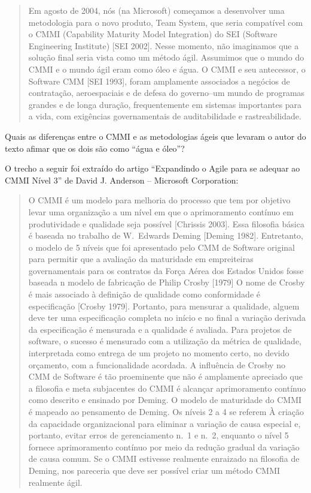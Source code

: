 \begin{quote}
  Em agosto de 2004, nós (na Microsoft) começamos a desenvolver uma
  metodologia para o novo produto, Team System, que seria compatível
  com o CMMI (Capability Maturity Model Integration) do SEI (Software
  Engineering Institute) [SEI 2002]. Nesse momento, não imaginamos que
  a solução final seria vista como um método ágil. Assumimos que o
  mundo do CMMI e o mundo ágil eram como óleo e água. O CMMI e seu
  antecessor, o Software CMM [SEI 1993], foram amplamente associados a
  negócios de contratação, aeroespaciais e de defesa do governo--um
  mundo de programas grandes e de longa duração, frequentemente em
  sistemas importantes para a vida, com exigências governamentais de
  auditabilidade e rastreabilidade.
\end{quote}

Quais as diferenças entre o CMMI e as metodologias ágeis que levaram o
autor do texto afimar que os dois são como ``água e óleo''?

 O trecho a seguir foi extraído do artigo 
``Expandindo o Agile para se adequar ao CMMI Nível 3'' de 
David J. Anderson -- Microsoft Corporation:

\begin{quote}
  O CMMI é um modelo para melhoria do processo que tem por objetivo
  levar uma organização a um nível em que o aprimoramento contínuo em
  produtividade e qualidade seja possível [Chrissis 2003]. Essa
  filosofia básica é baseada no trabalho de W.\ Edwards Deming [Deming
  1982]. Entretanto, o modelo de 5 níveis que foi apresentado pelo CMM
  de Software original para permitir que a avaliação da maturidade em
  empreiteiras governamentais para os contratos da Força Aérea dos
  Estados Unidos fosse baseada n modelo de fabricação de Philip Crosby
  [1979] O nome de Crosby é mais associado à definição de qualidade
  como conformidade é especificação [Crosby 1979]. Portanto, para
  mensurar a qualidade, alguem deve ter uma especificação completa no
  início e no final a variação derivada da especificação é mensurada
  e a qualidade é avaliada. Para projetos de software, o sucesso é
  mensurado com a utilização da métrica de qualidade, interpretada
  como entrega de um projeto no momento certo, no devido orçamento,
  com a funcionalidade acordada. A influência de Crosby no CMM de
  Software é tão proeminente que não é amplamente apreciado que a
  filosofia e meta subjacentes do CMMI é alcançar aprimoramento
  contínuo como descrito e ensinado por Deming.  O modelo de
  maturidade do CMMI é mapeado ao pensamento de Deming. Os níveis 2 a
  4 se referem À criação da capacidade organizacional para eliminar a
  variação de causa especial e, portanto, evitar erros de
  gerenciamento n.\ 1 e n.\ 2, enquanto o nível 5 fornece
  aprimoramento contínuo por meio da redução gradual da variação de
  causa comum. Se o CMMI estivesse realmente enraizado na filosofia de
  Deming, nos pareceria que deve ser possível criar um método CMMI
  realmente ágil.
\end{quote}

